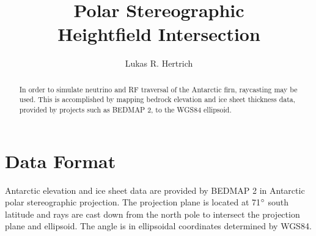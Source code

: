 \documentclass[aps,ams,prl,twocolumn,superscriptaddress]{revtex4-1}
\begin{document}
\pagestyle{headings}

\title{Polar Stereographic\\ Heightfield Intersection}

\author{Lukas R. Hertrich}

\begin{abstract}
In order to simulate neutrino and RF traversal of the Antarctic firn, raycasting may be used. This is accomplished by mapping bedrock elevation and ice sheet thickness
data, provided by projects such as BEDMAP 2, to the WGS84 ellipsoid.
\end{abstract}

\maketitle

\section{Data Format}
Antarctic elevation and ice sheet data are provided by BEDMAP 2 in Antarctic polar stereographic projection.
The projection plane is located at 71$\degree$ south latitude and rays are cast down from the north pole to intersect the projection plane and ellipsoid.
The angle is in ellipsoidal coordinates determined by WGS84.
\end{document}

